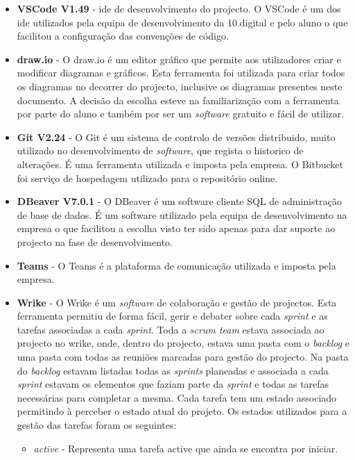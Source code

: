 \begin{itemize}
	\item \textbf{VSCode V1.49}\cite{ft1} - \acrfull{ide} de desenvolvimento do projecto. O VSCode é um dos \acrshort{ide} utilizados pela equipa de desenvolvimento da 10.digital e pelo aluno o que facilitou a configuração das convenções de código.
	\item \textbf{draw.io}\cite{ft2} - O draw.io é um editor gráfico que permite aos utilizadores criar e modificar diagramas e gráficos. Esta ferramenta foi utilizada para criar todos os diagramas no decorrer do projecto, inclusive os diagramas presentes neste documento. A decisão da escolha esteve na familiarização com a ferramenta por parte do aluno e também por ser um \textit{software} gratuito e fácil de utilizar.
	\item \textbf{Git V2.24}\cite{ft3} - O Git é um sistema de controlo de versões distribuido, muito utilizado no desenvolvimento de \textit{software}, que regista o historico de alterações. É uma ferramenta utilizada e imposta pela empresa. O Bitbucket\cite{bb} foi serviço de hospedagem utilizado para o repositório online.
	\item \textbf{DBeaver V7.0.1}\cite{ft4} - O DBeaver é um software cliente SQL de administração de base de dados. É um software utilizado pela equipa de desenvolvimento na empresa o que facilitou a escolha visto ter sido apenas para dar suporte ao projecto na fase de desenvolvimento.
		\item \textbf{Teams}\cite{ft5} - O Teams é a plataforma de comunicação utilizada e imposta pela empresa.
	\item \textbf{Wrike}\cite{ft6} - O Wrike é um \textit{software} de colaboração e gestão de projectos. Esta ferramenta permitiu de forma fácil, gerir e debater sobre cada \textit{sprint} e as tarefas associadas a cada \textit{sprint}. Toda a \textit{scrum team} estava associada ao projecto no wrike, onde, dentro do projecto, estava uma pasta com o \textit{backlog} e uma pasta com todas as reuniões marcadas para gestão do projecto. Na pasta do \textit{backlog} estavam listadas todas as \textit{sprints} planeadas e associada a cada \textit{sprint} estavam os elementos que faziam parte da \textit{sprint} e todas as tarefas necessárias para completar a mesma. Cada tarefa tem um estado associado permitindo à  perceber o estado atual do projeto. Os estados utilizados para a gestão das tarefas foram os seguintes:
	\begin{itemize}
		\item \textit{active} - Representa uma tarefa active que ainda se encontra por iniciar.

\end{itemize}
\end{itemize}
